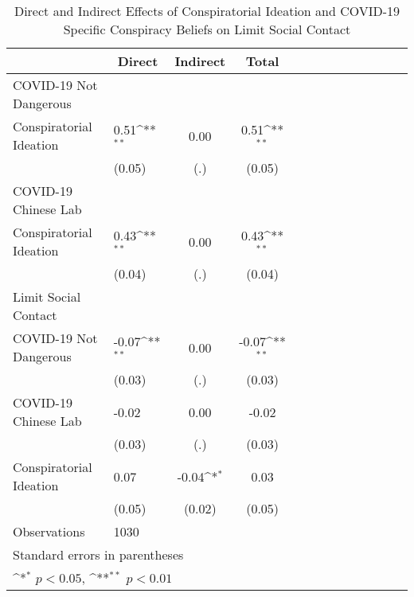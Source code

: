 \begin{table}[htbp]\centering
\def\sym#1{\ifmmode^{#1}\else\(^{#1}\)\fi}
\caption{Direct and Indirect Effects of Conspiratorial Ideation and COVID-19 Specific Conspiracy Beliefs on Limit Social Contact}
\begin{tabular}{l*{3}{l c c c}}
\hline\hline
                    &\multicolumn{1}{c}{Direct}&\multicolumn{1}{c}{Indirect}&\multicolumn{1}{c}{Total}\\
\hline
COVID-19 Not Dangerous&                    &                    &                    \\
Conspiratorial Ideation&        0.51\sym{**}&        0.00        &        0.51\sym{**}\\
                    &      (0.05)        &         (.)        &      (0.05)        \\
\hline
COVID-19 Chinese Lab&                    &                    &                    \\
Conspiratorial Ideation&        0.43\sym{**}&        0.00        &        0.43\sym{**}\\
                    &      (0.04)        &         (.)        &      (0.04)        \\
\hline
Limit Social Contact&                    &                    &                    \\
COVID-19 Not Dangerous&       -0.07\sym{**}&        0.00        &       -0.07\sym{**}\\
                    &      (0.03)        &         (.)        &      (0.03)        \\
[1em]
COVID-19 Chinese Lab&       -0.02        &        0.00        &       -0.02        \\
                    &      (0.03)        &         (.)        &      (0.03)        \\
[1em]
Conspiratorial Ideation&        0.07        &       -0.04\sym{*} &        0.03        \\
                    &      (0.05)        &      (0.02)        &      (0.05)        \\
\hline
Observations        &        1030        &                    &                    \\
\hline\hline
\multicolumn{4}{l}{\footnotesize Standard errors in parentheses}\\
\multicolumn{4}{l}{\footnotesize \sym{*} \(p<0.05\), \sym{**} \(p<0.01\)}\\
\end{tabular}
\end{table}

